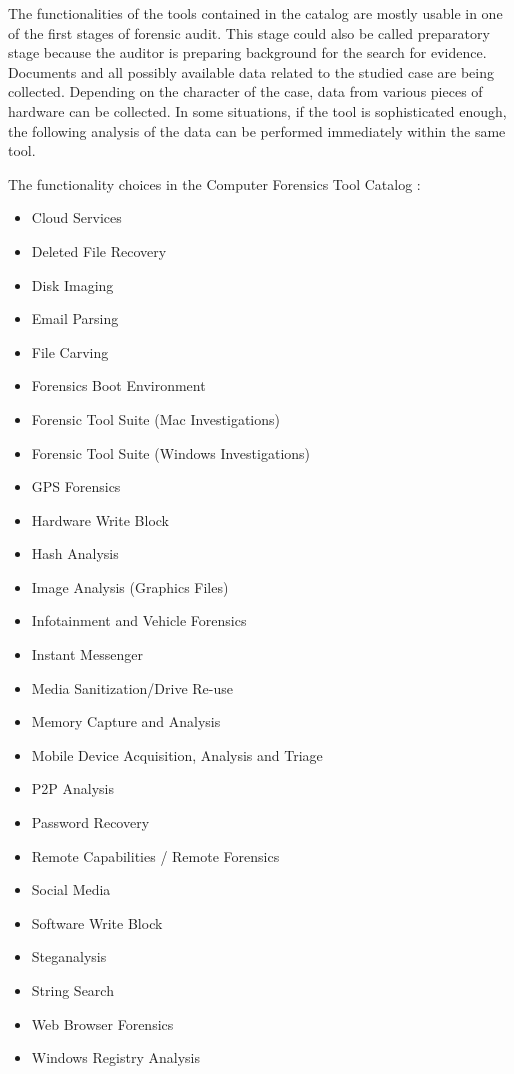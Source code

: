 The functionalities of the tools contained in the catalog are mostly usable in one of the first stages of forensic audit. This stage could also be called preparatory stage because the auditor is preparing background for the search for evidence. Documents and all possibly available data related to the studied case are being collected. Depending on the character of the case, data from various pieces of hardware can be collected. In some situations, if the tool is sophisticated enough, the following analysis of the data can be performed immediately within the same tool.

The functionality choices in the Computer Forensics Tool Catalog \cite{20}:

\begin{itemize}
\item Cloud Services
\item Deleted File Recovery
\item Disk Imaging
\item Email Parsing
\item File Carving
\item Forensics Boot Environment
\item Forensic Tool Suite (Mac Investigations)
\item Forensic Tool Suite (Windows Investigations)
\item GPS Forensics
\item Hardware Write Block
\item Hash Analysis
\item Image Analysis (Graphics Files)
\item Infotainment and Vehicle Forensics
\item Instant Messenger
\item Media Sanitization/Drive Re-use
\item Memory Capture and Analysis
\item Mobile Device Acquisition, Analysis and Triage
\item P2P Analysis
\item Password Recovery
\item Remote Capabilities / Remote Forensics
\item Social Media
\item Software Write Block
\item Steganalysis
\item String Search
\item Web Browser Forensics
\item Windows Registry Analysis
\end{itemize}



